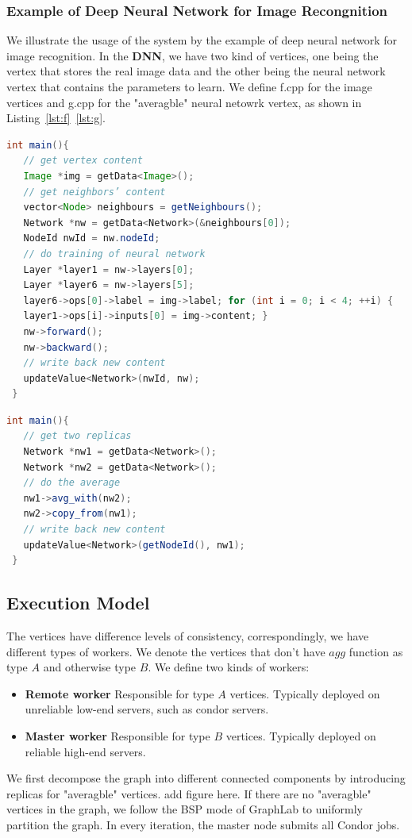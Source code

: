 \documentclass[11pt]{article}
\begin{document}
\subsubsection{Example of Deep Neural Network for Image Recongnition}
We illustrate the usage of the system by the example of deep	neural	network	
for image recognition. In the \textbf{DNN}, we have two kind of vertices, one 
being the vertex that stores the real image data and the other being the neural 
network vertex that contains the parameters to learn. 
We define \textsf{f.cpp} for the image vertices and \textsf{g.cpp} for the 
"averagble" neural netowrk vertex, as shown in Listing~\ref{lst:f}~\ref{lst:g}.
\begin{lstlisting}[language=java,basicstyle={\ttfamily\small},caption={f.cpp},label={lst:f},frame=single]
 int main(){ 
   // get vertex content
   Image *img = getData<Image>();
   // get neighbors’ content 
   vector<Node> neighbours = getNeighbours(); 
   Network *nw = getData<Network>(&neighbours[0]); 
   NodeId nwId = nw.nodeId;
   // do training of neural network
   Layer *layer1 = nw->layers[0];
   Layer *layer6 = nw->layers[5];
   layer6->ops[0]->label = img->label; for (int i = 0; i < 4; ++i) {
   layer1->ops[i]->inputs[0] = img->content; }
   nw->forward();
   nw->backward();
   // write back new content 
   updateValue<Network>(nwId, nw);
 }
\end{lstlisting}
\begin{lstlisting}[language=java,basicstyle={\ttfamily\small},caption={g.cpp},label={lst:g},frame=single]
 int main(){ 
   // get two replicas 
   Network *nw1 = getData<Network>(); 
   Network *nw2 = getData<Network>();
   // do the average 
   nw1->avg_with(nw2); 
   nw2->copy_from(nw1);
   // write back new content 
   updateValue<Network>(getNodeId(), nw1);
 } 
\end{lstlisting}

\subsection{Execution Model}
The vertices have difference levels of consistency, correspondingly, we have 
different types of workers. We denote the vertices that don't have $agg$ 
function as type $A$ and otherwise type $B$. We define two kinds of workers:
\begin{itemize}
 \item \textbf{Remote worker} Responsible for type $A$ vertices. Typically 
deployed on unreliable low-end servers, such as condor servers.
 \item \textbf{Master worker} Responsible for type $B$ vertices. Typically 
deployed on reliable high-end servers.
\end{itemize}
We first decompose the graph into different connected components by introducing 
replicas for "averagble" vertices. add figure here.
If there are no "averagble" vertices in the graph, we follow the BSP mode of 
GraphLab to uniformly partition the graph.
In every iteration, the master node submits all Condor jobs.
\end{document}
